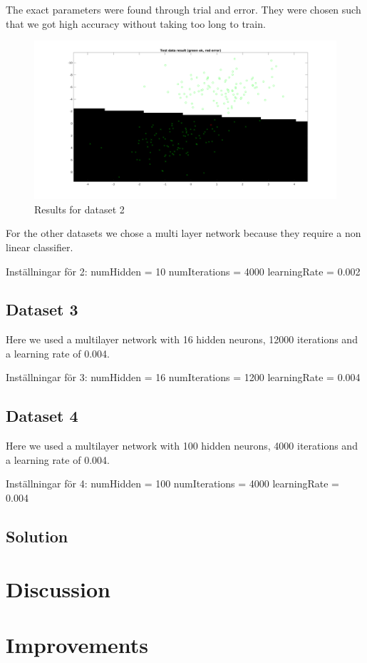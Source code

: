 \documentclass{article}
\begin{document}
The exact parameters were found through trial and error. They were
chosen such that we got high accuracy without taking too long to
train.

\begin{figure}
    \includegraphics[width=13cm]{dataset1res.png}
    \caption{Results for dataset 2}
    \label{fig:res1}
\end{figure}

For the other datasets we chose a multi layer network because they
require a non linear classifier.

Inställningar för 2:
numHidden = 10
numIterations = 4000
learningRate = 0.002

\subsection{Dataset 3}

Here we used a multilayer network with 16 hidden neurons, 12000
iterations and a learning rate of 0.004.

Inställningar för 3:
numHidden = 16
numIterations = 1200
learningRate = 0.004

\subsection{Dataset 4}

Here we used a multilayer network with 100 hidden neurons, 4000
iterations and a learning rate of 0.004.

Inställningar för 4:
numHidden = 100
numIterations = 4000
learningRate = 0.004

\subsection{Solution}

\section{Discussion}

\section{Improvements}
\end{document}
